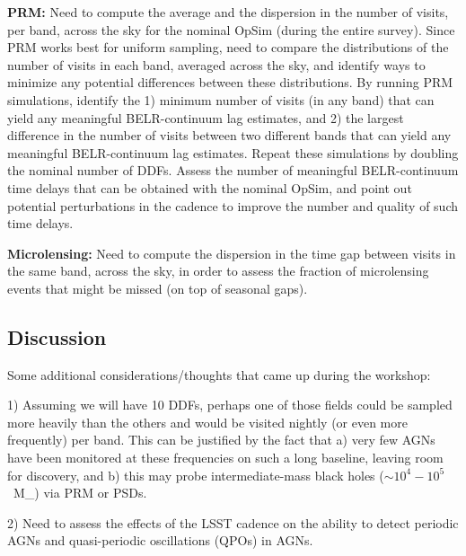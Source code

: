 {\bf PRM:} Need to compute the average and the dispersion in the
number of visits, per band, across the sky for the nominal OpSim
(during the entire survey). Since PRM works best for uniform sampling,
need to compare the distributions of the number of visits in each
band, averaged across the sky, and identify ways to minimize any
potential differences between these distributions. By running PRM
simulations, identify the 1) minimum number of visits (in any band)
that can yield any meaningful BELR-continuum lag estimates, and 2) the
largest difference in the number of visits between two different bands
that can yield any meaningful BELR-continuum lag estimates. Repeat
these simulations by doubling the nominal number of DDFs. Assess the
number of meaningful BELR-continuum time delays that can be obtained
with the nominal OpSim, and point out potential perturbations in the
cadence to improve the number and quality of such time delays.

{\bf Microlensing:} Need to compute the dispersion in the time gap
between visits in the same band, across the sky, in order to assess
the fraction of microlensing events that might be missed (on top of
seasonal gaps).


\subsection{Discussion}
\label{sec:\secname:discussion}


Some additional considerations/thoughts that came up during the workshop:

1) Assuming we will have 10 DDFs, perhaps one of those fields could be
sampled more heavily than the others and would be visited nightly (or
even more frequently) per band. This can be justified by the fact that
a) very few AGNs have been monitored at these frequencies on such a
long baseline, leaving room for discovery, and b) this may probe
intermediate-mass black holes ($\sim10^4 - 10^5$~M_{\odot}) via PRM or
PSDs.

2) Need to assess the effects of the LSST cadence on the ability to
detect periodic AGNs and quasi-periodic oscillations (QPOs) in AGNs.

\navigationbar
